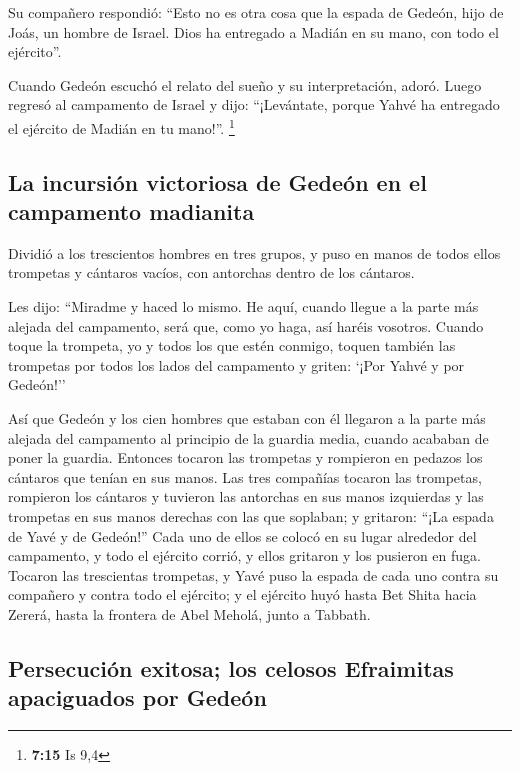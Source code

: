 \begin{paracol}{2}
 Su compañero respondió: ``Esto no es otra cosa que la
espada de Gedeón, hijo de Joás, un hombre de Israel. Dios ha entregado a
Madián en su mano, con todo el ejército''.

 Cuando Gedeón escuchó el relato del sueño y su
interpretación, adoró. Luego regresó al campamento de Israel y dijo:
``¡Levántate, porque Yahvé ha entregado el ejército de Madián en tu
mano!''. \footnote{\textbf{7:15} Is 9,4}

\hypertarget{la-incursiuxf3n-victoriosa-de-gedeuxf3n-en-el-campamento-madianita}{%
\subsection{La incursión victoriosa de Gedeón en el campamento
madianita}\label{la-incursiuxf3n-victoriosa-de-gedeuxf3n-en-el-campamento-madianita}}

 Dividió a los trescientos hombres en tres grupos, y puso
en manos de todos ellos trompetas y cántaros vacíos, con antorchas
dentro de los cántaros.

 Les dijo: ``Miradme y haced lo mismo. He aquí, cuando
llegue a la parte más alejada del campamento, será que, como yo haga,
así haréis vosotros.  Cuando toque la trompeta, yo y
todos los que estén conmigo, toquen también las trompetas por todos los
lados del campamento y griten: `¡Por Yahvé y por Gedeón!''

 Así que Gedeón y los cien hombres que estaban con él
llegaron a la parte más alejada del campamento al principio de la
guardia media, cuando acababan de poner la guardia. Entonces tocaron las
trompetas y rompieron en pedazos los cántaros que tenían en sus manos.
 Las tres compañías tocaron las trompetas, rompieron los
cántaros y tuvieron las antorchas en sus manos izquierdas y las
trompetas en sus manos derechas con las que soplaban; y gritaron: ``¡La
espada de Yavé y de Gedeón!''  Cada uno de ellos se
colocó en su lugar alrededor del campamento, y todo el ejército corrió,
y ellos gritaron y los pusieron en fuga.  Tocaron las
trescientas trompetas, y Yavé puso la espada de cada uno contra su
compañero y contra todo el ejército; y el ejército huyó hasta Bet Shita
hacia Zererá, hasta la frontera de Abel Meholá, junto a Tabbath.

\hypertarget{persecuciuxf3n-exitosa-los-celosos-efraimitas-apaciguados-por-gedeuxf3n}{%
\subsection{Persecución exitosa; los celosos Efraimitas apaciguados por
Gedeón}\label{persecuciuxf3n-exitosa-los-celosos-efraimitas-apaciguados-por-gedeuxf3n}}


\end{paracol}

